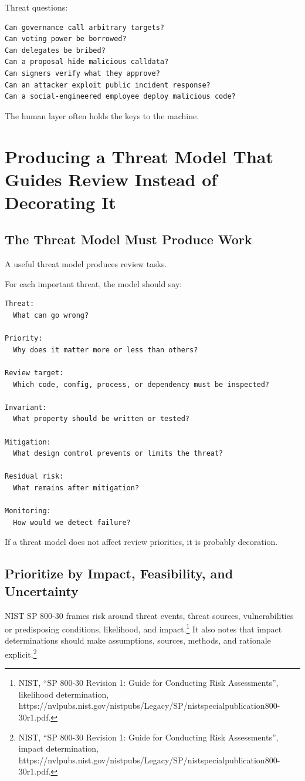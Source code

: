 Threat questions:

\begin{lstlisting}
Can governance call arbitrary targets?
Can voting power be borrowed?
Can delegates be bribed?
Can a proposal hide malicious calldata?
Can signers verify what they approve?
Can an attacker exploit public incident response?
Can a social-engineered employee deploy malicious code?
\end{lstlisting}

The human layer often holds the keys to the machine.

\section{Producing a Threat Model That Guides Review Instead of Decorating It}

\subsection{The Threat Model Must Produce Work}

A useful threat model produces review tasks.

For each important threat, the model should say:

\begin{lstlisting}
Threat:
  What can go wrong?

Priority:
  Why does it matter more or less than others?

Review target:
  Which code, config, process, or dependency must be inspected?

Invariant:
  What property should be written or tested?

Mitigation:
  What design control prevents or limits the threat?

Residual risk:
  What remains after mitigation?

Monitoring:
  How would we detect failure?
\end{lstlisting}

If a threat model does not affect review priorities, it is probably
decoration.

\subsection{Prioritize by Impact, Feasibility, and Uncertainty}

NIST SP 800-30 frames risk around threat events, threat sources,
vulnerabilities or predisposing conditions, likelihood, and
impact.\footnote{NIST, ``SP 800-30 Revision 1: Guide for Conducting Risk
  Assessments'', likelihood determination,
  https://nvlpubs.nist.gov/nistpubs/Legacy/SP/nistspecialpublication800-30r1.pdf.}
It also notes that impact determinations should make assumptions,
sources, methods, and rationale explicit.\footnote{NIST, ``SP 800-30
  Revision 1: Guide for Conducting Risk Assessments'', impact
  determination,
  https://nvlpubs.nist.gov/nistpubs/Legacy/SP/nistspecialpublication800-30r1.pdf.}

